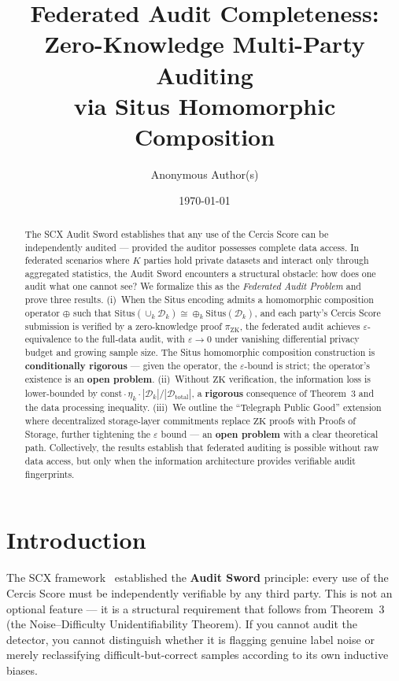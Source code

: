 \documentclass[12pt,a4paper]{article}
\title{\bfseries Federated Audit Completeness:\\
Zero-Knowledge Multi-Party Auditing\\
via Situs Homomorphic Composition}
\author{Anonymous Author(s)}
\date{\today}
\newcommand{\cD}{\mathcal{D}}
\newcommand{\Situs}{\mathrm{Situs}}
\newcommand{\ZK}{\mathrm{ZK}}
\begin{document}
\maketitle

\begin{abstract}
The SCX Audit Sword establishes that any use of the Cercis Score can be
independently audited — provided the auditor possesses complete data access.
In federated scenarios where $K$ parties hold private datasets and interact
only through aggregated statistics, the Audit Sword encounters a structural
obstacle: how does one audit what one cannot see?  We formalize this as the
\emph{Federated Audit Problem} and prove three results.  (i)~When the Situs
encoding admits a homomorphic composition operator $\oplus$ such that
$\Situs(\cup_k \cD_k) \cong \oplus_k \Situs(\cD_k)$, and each party's Cercis
Score submission is verified by a zero-knowledge proof $\pi_{\ZK}$, the
federated audit achieves $\varepsilon$-equivalence to the full-data audit,
with $\varepsilon \to 0$ under vanishing differential privacy budget and
growing sample size.  The Situs homomorphic composition construction is
\textbf{conditionally rigorous} — given the operator, the $\varepsilon$-bound
is strict; the operator's existence is an \textbf{open problem}.
(ii)~Without $\ZK$ verification, the information loss is lower-bounded by
$\mathrm{const} \cdot \eta_k \cdot |\cD_k|/|\cD_{\mathrm{total}}|$, a
\textbf{rigorous} consequence of Theorem~3 and the data processing inequality.
(iii)~We outline the ``Telegraph Public Good'' extension where decentralized
storage-layer commitments replace $\ZK$ proofs with Proofs of Storage,
further tightening the $\varepsilon$ bound — an \textbf{open problem} with
a clear theoretical path.  Collectively, the results establish that federated
auditing is possible without raw data access, but only when the information
architecture provides verifiable audit fingerprints.
\end{abstract}

\section{Introduction}

The SCX framework~\citep{scx2024cercis} established the \textbf{Audit Sword}
principle: every use of the Cercis Score must be independently verifiable by
any third party.  This is not an optional feature — it is a structural
requirement that follows from Theorem~3 (the Noise--Difficulty
Unidentifiability Theorem).  If you cannot audit the detector, you cannot
distinguish whether it is flagging genuine label noise or merely reclassifying
difficult-but-correct samples according to its own inductive biases.
\end{document}
